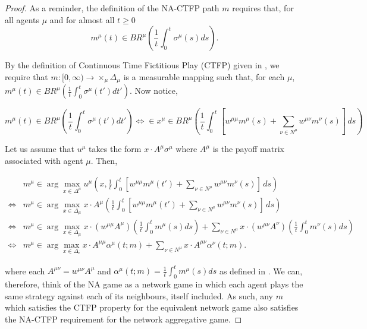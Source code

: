 \documentclass{article}
\theoremstyle{definition}
\newcommand{\wmunu}{w^{\mu \nu}}
\begin{document}
  \begin{proof}

   As a reminder, the definition of the NA-CTFP path $m$ requires that, for all agents $\mu$ and for almost all $t \geq 0$
%
    \begin{equation}
      m^\mu(t) \in BR^\mu \left( \frac{1}{t} \int_{0}^{t} \sigma^\mu(s) ds \right).
    \end{equation}
    
    By the definition of Continuous Time Fictitious Play (CTFP) given in \cite{Ewerhart}, we require that $m: [0, \infty) \rightarrow \times_\mu \Delta_\mu$ is a measurable mapping such that, for each $\mu$, $m^\mu(t) \in BR^\mu \left( \frac{1}{t} \int_{0}^{t} \sigma^\mu(t') dt' \right)$. Now notice,
    
    \begin{equation*}
      m^\mu(t) \in BR^\mu \left( \frac{1}{t} \int_{0}^{t} \sigma^\mu(t') dt' \right) \iff  \in x^\mu\in BR^\mu \left( \frac{1}{t} \int_{0}^{t} [w^{\mu \mu} m^\mu(s) + \sum_{\nu \in N^\mu} w^{\mu \nu} m^\nu(s)] \, ds \right)
    \end{equation*}
    
    Let us assume that $u^\mu$ takes the form $x \cdot A^\mu \sigma^\mu$ where $A^\mu$ is the payoff matrix associated with agent $\mu$. Then,
    
    \begin{align}
      & m^\mu \in \arg\max_{x \in \Delta^\mu} u^\mu(x,\frac{1}{t} \int_{0}^{t} [w^{\mu \mu} m^\mu(t') + \sum_{\nu \in N^\mu} w^{\mu \nu} m^\nu(s)] \, ds) \nonumber \\
      \iff & m^\mu \in \arg\max_{x \in \Delta_\mu} x \cdot A^\mu \left(\frac{1}{t} \int_{0}^{t} [w^{\mu \mu} m^\mu(t') + \sum_{\nu \in N^\mu} w^{\mu \nu} m^\nu(s)] \, ds \right) \nonumber \\
      \iff & m^\mu \in \arg \max_{x \in \Delta_\mu} x \cdot (w^{\mu \mu} A^\mu) \left( \frac{1}{t} \int_{0}^{t} m^\mu(s) ds\right) + \sum_{\nu \in N^\mu} x \cdot (\wmunu A^\nu) \left( \frac{1}{t} \int_{0}^{t} m^\nu(s) ds \right) \nonumber \\
      \iff & m^\mu \in \arg \max_{x \in \Delta_i} x \cdot A^{\mu \mu} \alpha^\mu(t; m) + \sum_{\nu \in N^\mu} x \cdot A^{\mu \nu} \alpha^\nu(t; m).
    \end{align}
    
    where each $A^{\mu \nu} = \wmunu A^\mu$ and $\alpha^\mu(t; m)
    =\frac{1}{t} \int_{0}^{t} m^\mu(s) ds$ as defined in \cite{Ewerhart2020}. We
    can, therefore, think of the NA game as a network game in which
    each agent plays the same strategy against each of its neighbours,
    itself included. As such, any $m$ which satisfies the CTFP
    property for the equivalent network game also satisfies the NA-CTFP
    requirement for the network aggregative game.
    

\end{proof}
\end{document}
